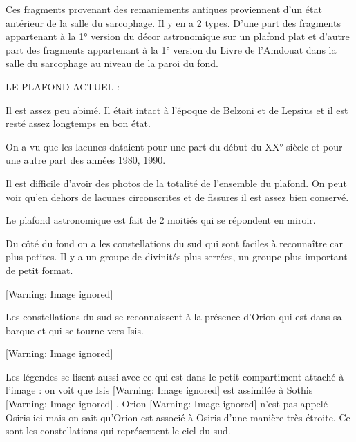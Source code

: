 \documentclass{article}
\begin{document}
Ces fragments provenant des remaniements antiques proviennent d’un état
antérieur de la salle du sarcophage. Il y en a 2 types. D’une part des
fragments appartenant à la 1° version du décor astronomique sur un
plafond plat et d’autre part des fragments appartenant à la 1° version
du Livre de l’Amdouat dans la salle du sarcophage au niveau de la paroi
du fond.

LE PLAFOND ACTUEL : 

Il est assez peu abimé. Il était intact à l’époque de Belzoni et de
Lepsius et il est resté assez longtemps en bon état. 

On a vu que les lacunes dataient pour une part du début du XX° siècle et
pour une autre part des années 1980, 1990. 

Il est difficile d’avoir des photos de la totalité de l’ensemble du
plafond. On peut voir qu’en dehors de lacunes circonscrites et de
fissures il est assez bien conservé.

Le plafond astronomique est fait de 2 moitiés qui se répondent en
miroir. 

Du côté du fond on a les constellations du sud qui sont faciles à
reconnaître car plus petites. Il y a un groupe de divinités plus
serrées, un groupe plus important de petit format. 

  [Warning: Image ignored] %
 

Les constellations du sud se reconnaissent à la présence d’Orion qui est
dans sa barque et qui se tourne vers Isis. 

  [Warning: Image ignored] %
 

Les légendes se lisent aussi avec ce qui est dans le petit compartiment
attaché à l’image : on voit que Isis   [Warning: Image ignored]
   est assimilée à Sothis   [Warning: Image ignored]
 . Orion   [Warning: Image ignored] %
  n’est pas appelé Osiris ici mais on sait qu’Orion est associé à Osiris
d’une manière très étroite. Ce sont les constellations qui représentent
le ciel du sud.  
\end{document}
